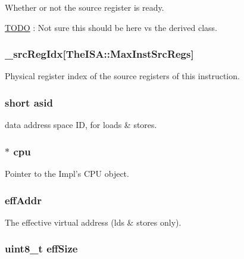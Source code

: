 \label{classBaseDynInst_a78a797b8c24ad873d0cbe5f52487b02f}
Whether or not the source register is ready. \begin{Desc}
\item[\hyperlink{todo__todo000012}{TODO}]: Not sure this should be here vs the derived class. \end{Desc}
\hypertarget{classBaseDynInst_a648b3ab7be47d79ef8eb06b5f5238e92}{
\subsubsection[{\_\-srcRegIdx}]{ {\bf \_\-srcRegIdx}\mbox{[}TheISA::MaxInstSrcRegs\mbox{]}}}
\label{classBaseDynInst_a648b3ab7be47d79ef8eb06b5f5238e92}
Physical register index of the source registers of this instruction. \hypertarget{classBaseDynInst_a03f3e3cd7500e78001075b53eab05a53}{
\subsubsection[{asid}]{\setlength{\rightskip}{0pt plus 5cm}short {\bf asid}}}
\label{classBaseDynInst_a03f3e3cd7500e78001075b53eab05a53}
data address space ID, for loads \& stores. \hypertarget{classBaseDynInst_af0927cfb92eca43bfa3bfd5ce19af308}{
\subsubsection[{cpu}]{$\ast$ {\bf cpu}}}
\label{classBaseDynInst_af0927cfb92eca43bfa3bfd5ce19af308}
Pointer to the Impl's CPU object. \hypertarget{classBaseDynInst_a1097c58b547d58e4544cbf31fa68a390}{
\subsubsection[{effAddr}]{ {\bf effAddr}}}
\label{classBaseDynInst_a1097c58b547d58e4544cbf31fa68a390}
The effective virtual address (lds \& stores only). \hypertarget{classBaseDynInst_ad52a4366d1b850793e6d979a7459cab4}{
\subsubsection[{effSize}]{\setlength{\rightskip}{0pt plus 5cm}uint8\_\-t {\bf effSize}}}
